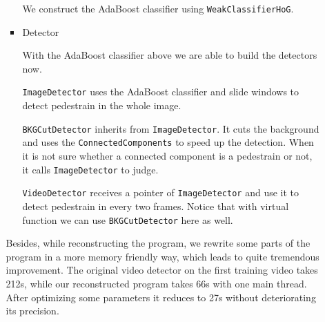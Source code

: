 \documentclass[a4paper]{article}
\begin{document}
\begin{enumerate}
\begin{itemize}
\begin{itemize}
We construct the AdaBoost classifier using \lstinline{WeakClassifierHoG}.

\item Detector

With the AdaBoost classifier above we are able to build the detectors now.

\lstinline{ImageDetector} uses the AdaBoost classifier and slide windows to detect pedestrain in the whole image.

\lstinline{BKGCutDetector} inherits from \lstinline{ImageDetector}. It cuts the background and uses the \lstinline{ConnectedComponents} to speed up the detection. When it is not sure whether a connected component is a pedestrain or not, it calls \lstinline{ImageDetector} to judge.

\lstinline{VideoDetector} receives a pointer of \lstinline{ImageDetector} and use it to detect pedestrain in every two frames. Notice that with virtual function we can use \lstinline{BKGCutDetector} here as well.

\end{itemize}

Besides, while reconstructing the program, we rewrite some parts of the program in a more memory friendly way, which leads to quite tremendous improvement. The original video detector on the first training video takes 212s, while our reconstructed program takes 66s with one main thread. After optimizing some parameters it reduces to 27s without deteriorating its precision.


\end{itemize}
\end{enumerate}
\end{document}
